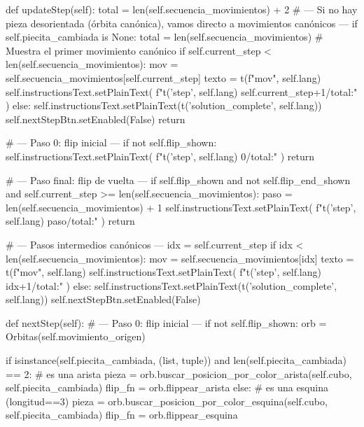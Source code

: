     def updateStep(self):
        total = len(self.secuencia_movimientos) + 2
        # --- Si no hay pieza desorientada (órbita canónica), vamos directo a movimientos canónicos ---
        if self.piecita_cambiada is None:
            total = len(self.secuencia_movimientos)
            # Muestra el primer movimiento canónico
            if self.current_step < len(self.secuencia_movimientos):
                mov = self.secuencia_movimientos[self.current_step]
                texto = t(f"{mov}", self.lang)
                self.instructionsText.setPlainText(
                    f"{t('step', self.lang)} {self.current_step+1}/{total}:"
                )
            else:
                self.instructionsText.setPlainText(t('solution_complete', self.lang))
                self.nextStepBtn.setEnabled(False)
            return

        # --- Paso 0: flip inicial ---
        if not self.flip_shown:
            self.instructionsText.setPlainText(
                f"{t('step', self.lang)} 0/{total}:"
            )
            return

        # --- Paso final: flip de vuelta ---
        if self.flip_shown and not self.flip_end_shown and self.current_step >= len(self.secuencia_movimientos):
            paso = len(self.secuencia_movimientos) + 1
            self.instructionsText.setPlainText(
                f"{t('step', self.lang)} {paso}/{total}:"
            )
            return

        # --- Pasos intermedios canónicos ---
        idx = self.current_step
        if idx < len(self.secuencia_movimientos):
            mov = self.secuencia_movimientos[idx]
            texto = t(f"{mov}", self.lang)
            self.instructionsText.setPlainText(
                f"{t('step', self.lang)} {idx+1}/{total}:"
            )
        else:
            self.instructionsText.setPlainText(t('solution_complete', self.lang))
            self.nextStepBtn.setEnabled(False)

            
    def nextStep(self):
        # --- Paso 0: flip inicial ---
        if not self.flip_shown:
            orb = Orbitas(self.movimiento_origen)

            if isinstance(self.piecita_cambiada, (list, tuple)) and len(self.piecita_cambiada) == 2:
                # es una arista
                pieza = orb.buscar_posicion_por_color_arista(self.cubo,
                                                            self.piecita_cambiada)
                flip_fn = orb.flippear_arista
            else:
                # es una esquina (longitud==3)
                pieza = orb.buscar_posicion_por_color_esquina(self.cubo,
                                                            self.piecita_cambiada)
                flip_fn = orb.flippear_esquina

